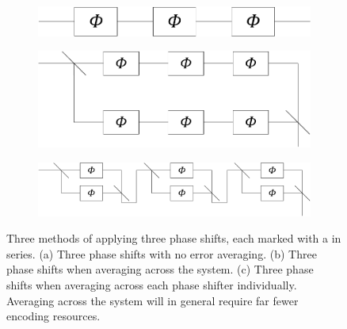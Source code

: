 \documentclass[aps,pra,twocolumn,superscriptaddress,numerical,floatfix]{revtex4-1}
\begin{document}
\begin{figure}
	\centering
	\begin{subfigure}[b]{\columnwidth}
		\includegraphics[width=0.65\columnwidth]{three_phase_applying_systems_a.pdf}
		\caption{}
		\label{fig:Different methods of implementation a} 
	\end{subfigure}
	
	\begin{subfigure}[b]{\columnwidth}
		\includegraphics[width=0.80\columnwidth]{three_phase_applying_systems_b.pdf}
		\caption{}
		\label{fig:Different methods of implementation b}
	\end{subfigure}

	\begin{subfigure}[b]{\columnwidth}
		\includegraphics[width=1\columnwidth]{three_phase_applying_systems_c.pdf}
		\caption{}
		\label{fig:Different methods of implementation c}
	\end{subfigure}
	
	\caption[Two numerical solutions]{Three methods of applying three phase shifts, each marked with a in
			series. (a) Three phase shifts with no error averaging. (b) Three phase
			shifts when averaging across the system. (c) Three phase shifts when
			averaging across each phase shifter individually. Averaging across the
			system will in general require far fewer encoding resources.
			\label{fig:Different methods of implementation}}
\end{figure}
\end{document}
